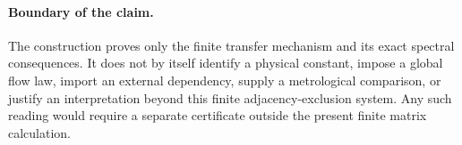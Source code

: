 \paragraph{Boundary of the claim.}
The construction proves only the finite transfer mechanism and its exact spectral consequences. It does not by itself identify a physical constant, impose a global flow law, import an external dependency, supply a metrological comparison, or justify an interpretation beyond this finite adjacency-exclusion system. Any such reading would require a separate certificate outside the present finite matrix calculation.

